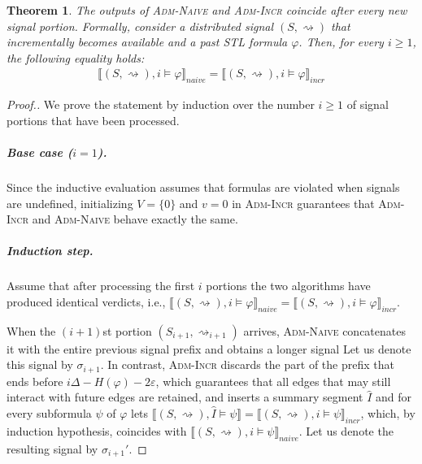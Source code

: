 \documentclass[iicol,lineno]{sn-jnl}
\newcommand{\hb}{\rightsquigarrow}
\newcommand{\?}{\text{?}}
\newtheorem{theorem}{Theorem}
\begin{document}
	\begin{theorem} \label{cl:algoOnline}
		The outputs of \textsc{Adm-Naive} and \textsc{Adm-Incr} coincide after every new signal portion.
		Formally, consider a distributed signal $(S,{\hb})$ that incrementally becomes available and a past STL formula $\varphi$.
		Then, for every $i \geq 1$, the following equality holds:
		\begin{align*}
			\llbracket (S, {\hb}), i \models \varphi \rrbracket_{\textit{naive}} = \llbracket (S, {\hb}), i \models \varphi \rrbracket_{\textit{incr}}
		\end{align*}
	\end{theorem}
	\begin{proof}[\normalsize Proof.]
		\normalsize
		We prove the statement by induction over the number $i \geq 1$ of signal portions that have been processed.
		
		\subparagraph*{Base case ($i = 1$).}
		Since the inductive evaluation assumes that formulas are violated when signals are undefined, initializing $V = \{0\}$ and $v=0$ in \textsc{Adm-Incr} guarantees that \textsc{Adm-Incr} and \textsc{Adm-Naive} behave exactly the same.
		
		
		\subparagraph*{Induction step.}
		Assume that after processing the first $i$ portions the two algorithms have
		produced identical verdicts, i.e., $ \llbracket (S,\hb), i \models \varphi \rrbracket_{\textit{naive}} = \llbracket (S,\hb), i \models \varphi \rrbracket_{\textit{incr}}$.
		
		When the $(i+1)$st portion $(S_{i+1},\hb_{i+1})$ arrives, \textsc{Adm-Naive} concatenates it with the entire previous signal prefix and obtains a longer signal
		Let us denote this signal by $\sigma_{i+1}$.
		In contrast, \textsc{Adm-Incr} discards the part of the prefix that ends before $i\Delta - H(\varphi) - 2\varepsilon$, which guarantees that all edges that may still interact with future edges are retained, and inserts a summary segment
		$\hat{I}$ and for every subformula $\psi$ of $\varphi$ lets $\llbracket (S,\hb), \hat{I} \models \psi \rrbracket = \llbracket (S,\hb), i \models \psi \rrbracket_{\textit{incr}}$, which, by induction hypothesis, coincides with $\llbracket (S,\hb), i \models \psi \rrbracket_{\textit{naive}}$.
		Let us denote the resulting signal by $\sigma_{i+1}'$.
		

\end{proof}
\end{document}
